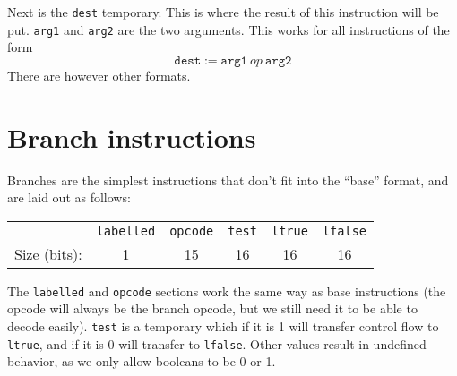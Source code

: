 \documentclass{article}
\begin{document}
Next is the \texttt{dest} temporary. This is where the result of this
instruction will be put. \texttt{arg1} and \texttt{arg2} are the two
arguments. This works for all instructions of the form
\[
  \texttt{dest} := \texttt{arg1}\ op\ \texttt{arg2}
\]
There are however other formats.
\section{Branch instructions}
Branches are the simplest instructions that don't fit into the ``base'' format,
and are laid out as follows:\\
\begin{center}
  \begin{tabular}{r|c|c|c|c|c|}
    \cline{2-6}
    & \texttt{labelled} & \texttt{opcode} & \texttt{test} & \texttt{ltrue}
    & \texttt{lfalse} \\ \cline{2-6}
    Size (bits): & 1 & 15 & 16 & 16 & 16 \\ \cline{2-6}
  \end{tabular}
\end{center}
The \texttt{labelled} and \texttt{opcode} sections work the same way as base
instructions (the opcode will always be the branch opcode, but we still need it
to be able to decode easily). \texttt{test} is a temporary which if it is 1 will
transfer control flow to \texttt{ltrue}, and if it is 0 will transfer to
\texttt{lfalse}. Other values result in undefined behavior, as we only allow
booleans to be 0 or 1.
\end{document}
